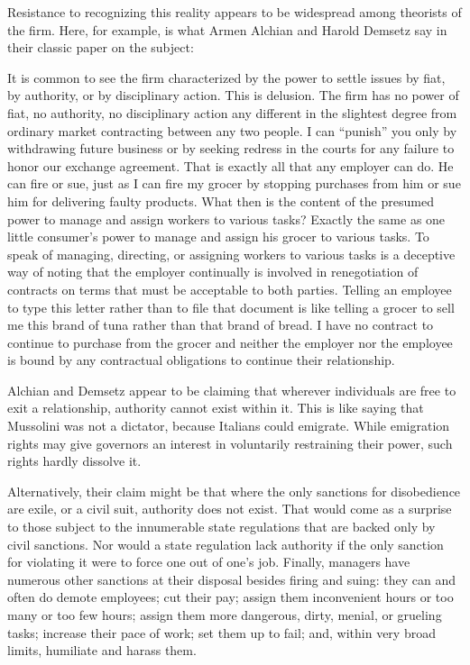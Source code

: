 \documentclass[
  letterpaper,
  11pt,
  DIV=9,
  openright]{scrbook}
\renewenvironment{quote}{
  \list{}{\leftmargin=2em\rightmargin=2em}
  \item\relax\small
}
{\endlist}
\begin{document}
Resistance to recognizing this reality appears to be widespread among
theorists of the firm. Here, for example, is what Armen Alchian and
Harold Demsetz say in their classic paper on the subject:

\begin{quote}
It is common to see the firm characterized by the power to settle issues
by fiat, by authority, or by disciplinary action. This is delusion. The
firm has no power of fiat, no authority, no disciplinary action any
different in the slightest degree from ordinary market contracting
between any two people. I can ``punish'' you only by withdrawing future
business or by seeking redress in the courts for any failure to honor
our exchange agreement. That is exactly all that any employer can do. He
can fire or sue, just as I can fire my grocer by stopping purchases from
him or sue him for delivering faulty products. What then is the content
of the presumed power to manage and assign workers to various tasks?
Exactly the same as one little consumer's power to manage and assign his
grocer to various tasks. To speak of managing, directing, or assigning
workers to various tasks is a deceptive way of noting that the employer
continually is involved in renegotiation of contracts on terms that must
be acceptable to both parties. Telling an employee to type this letter
rather than to file that document is like telling a grocer to sell me
this brand of tuna rather than that brand of bread. I have no contract
to continue to purchase from the grocer and neither the employer nor the
employee is bound by any contractual obligations to continue their
relationship.
\end{quote}

Alchian and Demsetz appear to be claiming that wherever individuals are
free to exit a relationship, authority cannot exist within it. This is
like saying that Mussolini was not a dictator, because Italians could
emigrate. While emigration rights may give governors an interest in
voluntarily restraining their power, such rights hardly dissolve it.

Alternatively, their claim might be that where the only sanctions for
disobedience are exile, or a civil suit, authority does not exist. That
would come as a surprise to those subject to the innumerable state
regulations that are backed only by civil sanctions. Nor would a state
regulation lack authority if the only sanction for violating it were to
force one out of one's job. Finally, managers have numerous other
sanctions at their disposal besides firing and suing: they can and often
do demote employees; cut their pay; assign them inconvenient hours or
too many or too few hours; assign them more dangerous, dirty, menial, or
grueling tasks; increase their pace of work; set them up to fail; and,
within very broad limits, humiliate and harass them.
\end{document}
